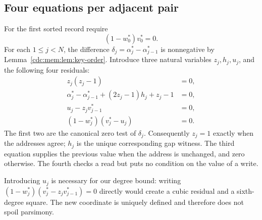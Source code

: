 \documentclass[11pt,a4paper]{article}
\theoremstyle{definition}
\theoremstyle{remark}
\begin{document}
\subsection{Four equations per adjacent pair}
For the first sorted record require
\begin{equation}\label{cdc:mem:eq:first}
 (1-w_0^*)v_0^*=0.
\end{equation}
For each $1\leq j<N$, the difference
$\delta_j=\alpha_j^*-\alpha_{j-1}^*$ is nonnegative by
Lemma~\ref{cdc:mem:lem:key-order}. Introduce three natural variables $z_j,h_j,u_j$,
and the following four residuals:
\begin{align}
 z_j(z_j-1)&=0,\label{cdc:mem:eq:adj-bit}\\
 \alpha_j^*-\alpha_{j-1}^*+(2z_j-1)h_j+z_j-1&=0,\label{cdc:mem:eq:adj-gap}\\
 u_j-z_jv_{j-1}^*&=0,\label{cdc:mem:eq:adj-prev}\\
 (1-w_j^*)(v_j^*-u_j)&=0.\label{cdc:mem:eq:adj-read}
\end{align}
The first two are the canonical zero test of $\delta_j$. Consequently
$z_j=1$ exactly when the addresses agree; $h_j$ is the unique corresponding
gap witness. The third equation supplies the previous value when the address is
unchanged, and zero otherwise. The fourth checks a read but puts no condition
on the value of a write.

Introducing $u_j$ is necessary for our degree bound: writing
$(1-w_j^*)(v_j^*-z_jv_{j-1}^*)=0$ directly would create a cubic residual and a
sixth-degree square. The new coordinate is uniquely defined and therefore does
not spoil parsimony.
\end{document}
